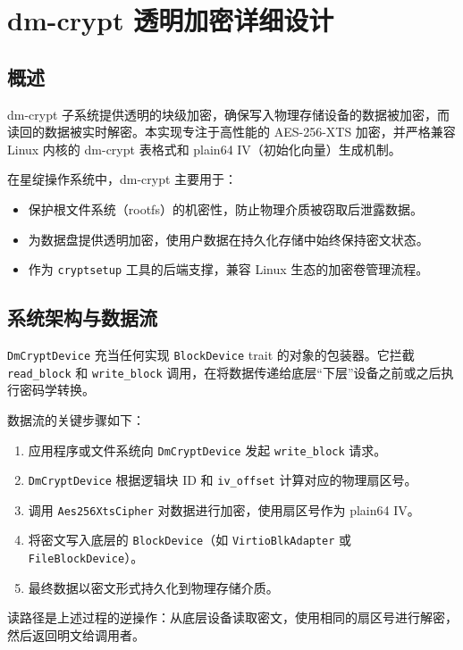 \chapter{dm-crypt 透明加密详细设计}

\section{概述}

dm-crypt 子系统提供透明的块级加密，确保写入物理存储设备的数据被加密，而读回的数据被实时解密。本实现专注于高性能的 AES-256-XTS 加密，并严格兼容 Linux 内核的 dm-crypt 表格式和 plain64 IV（初始化向量）生成机制。

在星绽操作系统中，dm-crypt 主要用于：
\begin{itemize}
    \item 保护根文件系统（rootfs）的机密性，防止物理介质被窃取后泄露数据。
    \item 为数据盘提供透明加密，使用户数据在持久化存储中始终保持密文状态。
    \item 作为 \texttt{cryptsetup} 工具的后端支撑，兼容 Linux 生态的加密卷管理流程。
\end{itemize}

\section{系统架构与数据流}

\texttt{DmCryptDevice} 充当任何实现 \texttt{BlockDevice} trait 的对象的包装器。它拦截 \texttt{read\_block} 和 \texttt{write\_block} 调用，在将数据传递给底层“下层”设备之前或之后执行密码学转换。

数据流的关键步骤如下：
\begin{enumerate}
    \item 应用程序或文件系统向 \texttt{DmCryptDevice} 发起 \texttt{write\_block} 请求。
    \item \texttt{DmCryptDevice} 根据逻辑块 ID 和 \texttt{iv\_offset} 计算对应的物理扇区号。
    \item 调用 \texttt{Aes256\allowbreak XtsCipher} 对数据进行加密，使用扇区号作为 plain64 IV。
    \item 将密文写入底层的 \texttt{BlockDevice}（如 \texttt{VirtioBlkAdapter} 或 \texttt{FileBlockDevice}）。
    \item 最终数据以密文形式持久化到物理存储介质。
\end{enumerate}

读路径是上述过程的逆操作：从底层设备读取密文，使用相同的扇区号进行解密，然后返回明文给调用者。

